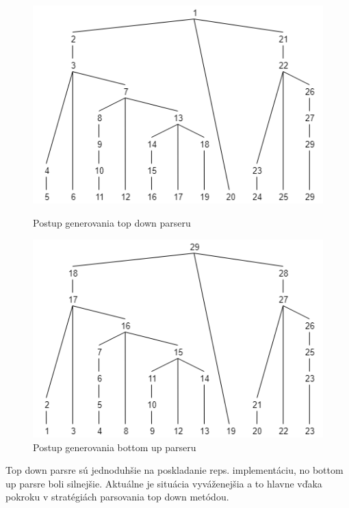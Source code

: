 \begin{figure}[H]
  \centering
  \begin{minipage}[b]{0.45\textwidth}
    \includegraphics[width=\textwidth]{figures/parseTreeExampleTopDown.png}
    \caption{Postup generovania top down parseru}
    \label{fig:parseTreeExampleTopDown}
  \end{minipage}
  \hfill
  \begin{minipage}[b]{0.45\textwidth}
    \includegraphics[width=\textwidth]{figures/parseTreeExampleBottomUp.png}
    \caption{Postup generovania bottom up parseru}
    \label{fig:parseTreeExampleBottomUp}
  \end{minipage}
\end{figure}

Top down parsre sú jednoduhšie na poskladanie reps. implementáciu, no bottom up parsre boli silnejšie. Aktuálne je situácia vyváženejšia a to hlavne vďaka pokroku v stratégiách parsovania top down metódou. 

